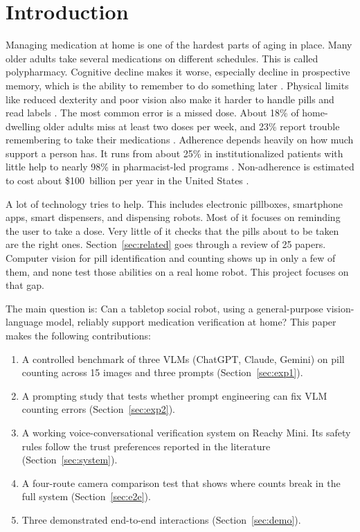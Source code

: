 \documentclass[10pt,twocolumn]{article}
\begin{document}
\section{Introduction}
Managing medication at home is one of the hardest parts of aging in place. Many
older adults take several medications on different schedules. This is called
polypharmacy. Cognitive decline makes it worse, especially decline in prospective
memory, which is the ability to remember to do something later
\cite{park1992,palen2006}. Physical limits like reduced dexterity and poor vision
also make it harder to handle pills and read labels \cite{pratiwi2023}. The most
common error is a missed dose. About 18\% of home-dwelling older adults miss at
least two doses per week, and 23\% report trouble remembering to take their
medications \cite{rantanen2017}. Adherence depends heavily on how much support a
person has. It runs from about 25\% in institutionalized patients with little help
to nearly 98\% in pharmacist-led programs \cite{mehany2026}. Non-adherence is
estimated to cost about \$100~billion per year in the United States
\cite{ansari2011}.

A lot of technology tries to help. This includes electronic pillboxes, smartphone
apps, smart dispensers, and dispensing robots. Most of it focuses on reminding the
user to take a dose. Very little of it checks that the pills about to be taken are
the right ones. Section~\ref{sec:related} goes through a review of 25 papers.
Computer vision for pill identification and counting shows up in only a few of them,
and none test those abilities on a real home robot. This project focuses on that
gap.

The main question is: Can a tabletop social robot, using a general-purpose
vision-language model, reliably support medication verification at home? This paper
makes the following contributions:
\begin{enumerate}\itemsep1pt
\item A controlled benchmark of three VLMs (ChatGPT, Claude, Gemini) on pill
counting across 15 images and three prompts (Section~\ref{sec:exp1}).
\item A prompting study that tests whether prompt engineering can fix VLM counting
errors (Section~\ref{sec:exp2}).
\item A working voice-conversational verification system on Reachy Mini. Its safety
rules follow the trust preferences reported in the literature
(Section~\ref{sec:system}).
\item A four-route camera comparison test that shows where counts break in the full
system (Section~\ref{sec:e2e}).
\item Three demonstrated end-to-end interactions (Section~\ref{sec:demo}).
\end{enumerate}
\end{document}
